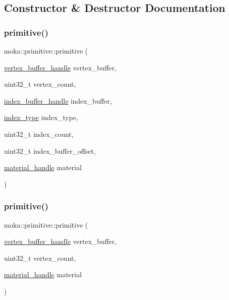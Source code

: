 \subsection{Constructor \& Destructor Documentation}
\mbox{\label{classmoka_1_1primitive_a1ca8472d19dae33ca651f90b66639812}} 
\subsubsection{\texorpdfstring{primitive()}{primitive()}\hspace{0.1cm}{\footnotesize\ttfamily [1/2]}}
{\footnotesize\ttfamily moka\+::primitive\+::primitive (\begin{DoxyParamCaption}\item[{\mbox{\hyperlink{structmoka_1_1vertex__buffer__handle}{vertex\+\_\+buffer\+\_\+handle}}}]{vertex\+\_\+buffer,  }\item[{uint32\+\_\+t}]{vertex\+\_\+count,  }\item[{\mbox{\hyperlink{structmoka_1_1index__buffer__handle}{index\+\_\+buffer\+\_\+handle}}}]{index\+\_\+buffer,  }\item[{\mbox{\hyperlink{namespacemoka_a32244b0de63481283738e2db11639e3f}{index\+\_\+type}}}]{index\+\_\+type,  }\item[{uint32\+\_\+t}]{index\+\_\+count,  }\item[{uint32\+\_\+t}]{index\+\_\+buffer\+\_\+offset,  }\item[{\mbox{\hyperlink{structmoka_1_1material__handle}{material\+\_\+handle}}}]{material }\end{DoxyParamCaption})}

\mbox{\label{classmoka_1_1primitive_a72056e3a435f7d2044ec523348cf875d}} 
\subsubsection{\texorpdfstring{primitive()}{primitive()}\hspace{0.1cm}{\footnotesize\ttfamily [2/2]}}
{\footnotesize\ttfamily moka\+::primitive\+::primitive (\begin{DoxyParamCaption}\item[{\mbox{\hyperlink{structmoka_1_1vertex__buffer__handle}{vertex\+\_\+buffer\+\_\+handle}}}]{vertex\+\_\+buffer,  }\item[{uint32\+\_\+t}]{vertex\+\_\+count,  }\item[{\mbox{\hyperlink{structmoka_1_1material__handle}{material\+\_\+handle}}}]{material }\end{DoxyParamCaption})}



